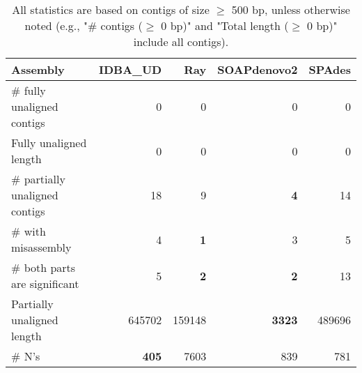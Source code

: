 \documentclass[12pt,a4paper]{article}
\begin{document}
\begin{table}[ht]
\begin{center}
\caption{All statistics are based on contigs of size $\geq$ 500 bp, unless otherwise noted (e.g., "\# contigs ($\geq$ 0 bp)" and "Total length ($\geq$ 0 bp)" include all contigs).}
\begin{tabular}{|l*{4}{|r}|}
\hline
Assembly & IDBA\_UD & Ray & SOAPdenovo2 & SPAdes \\ \hline
\# fully unaligned contigs & 0 & 0 & 0 & 0 \\ \hline
Fully unaligned length & 0 & 0 & 0 & 0 \\ \hline
\# partially unaligned contigs & 18 & 9 & {\bf 4} & 14 \\ \hline
\hspace{5mm}\# with misassembly & 4 & {\bf 1} & 3 & 5 \\ \hline
\hspace{5mm}\# both parts are significant & 5 & {\bf 2} & {\bf 2} & 13 \\ \hline
Partially unaligned length & 645702 & 159148 & {\bf 3323} & 489696 \\ \hline
\# N's & {\bf 405} & 7603 & 839 & 781 \\ \hline
\end{tabular}
\end{center}
\end{table}
\end{document}
